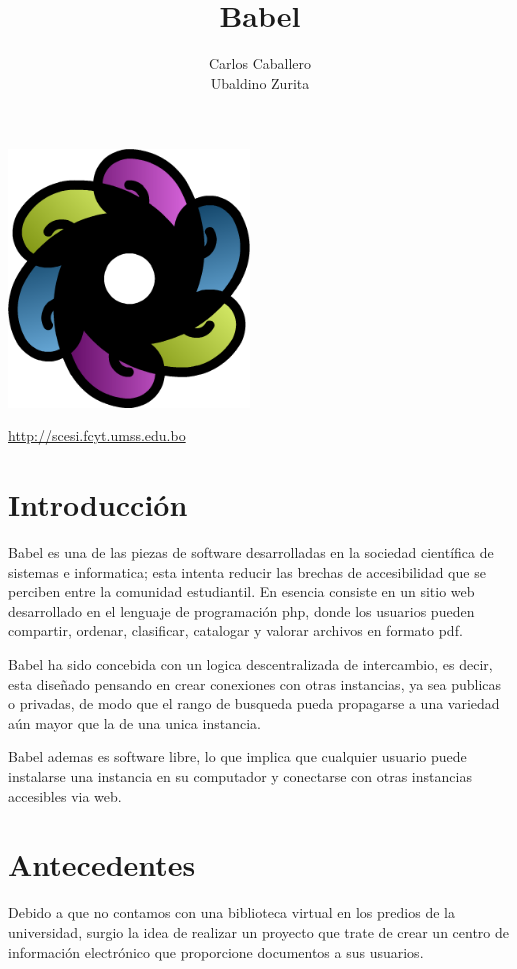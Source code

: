 \documentclass[letter,12pt]{article}
\title{\bf Babel}
\author{Carlos Caballero\\Ubaldino Zurita}
\begin{document}
\maketitle
\begin{center}\includegraphics[width=0.48\textwidth]{img/babel.png}\end{center}
\begin{center}\url {http://scesi.fcyt.umss.edu.bo}\end{center}
\pagebreak

\tableofcontents
\pagebreak

\section{Introducción}
Babel es una de las piezas de software desarrolladas en la sociedad científica de sistemas e
informatica; esta intenta reducir las brechas de accesibilidad que se perciben entre la comunidad
estudiantil. En esencia consiste en un sitio web desarrollado en el lenguaje de programación php,
donde los usuarios pueden compartir, ordenar, clasificar, catalogar y valorar archivos en formato
pdf.

Babel ha sido concebida con un logica descentralizada de intercambio, es decir, esta diseñado
pensando en crear conexiones con otras instancias, ya sea publicas o privadas, de modo que el
rango de busqueda pueda propagarse a una variedad aún mayor que la de una unica instancia.

Babel ademas es software libre, lo que implica que cualquier usuario puede instalarse una 
instancia en su computador y conectarse con otras instancias accesibles via web.

\section{Antecedentes}
Debido a que no contamos con una biblioteca virtual en los predios de la universidad, surgio la
idea de realizar un proyecto que trate de crear un centro de información electrónico que
proporcione documentos a sus usuarios.
\end{document}
